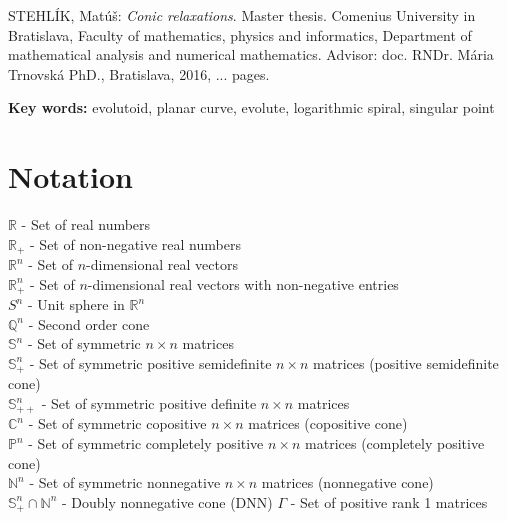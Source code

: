 \documentclass[12pt]{book}
\theoremstyle{definition}
\begin{document}
STEHLÍK, Matúš: {\it Conic relaxations}. Master thesis. Comenius University in Bratislava, Faculty of mathematics, physics and informatics, Department of mathematical analysis and numerical mathematics. Advisor: doc. RNDr. Mária Trnovská PhD., Bratislava, 2016, ... pages.

\bigskip


\bigskip

{\bf Key words: } evolutoid, planar curve, evolute, logarithmic spiral, singular point

\vfill\null\eject

\tableofcontents
\listoffigures


\newpage
\section*{Notation}

$\mathbb{R}$ - Set of real numbers \\
$\mathbb{R}_+$ - Set of non-negative real numbers \\
$\mathbb{R}^n$ - Set of $n$-dimensional real vectors   \\
$\mathbb{R}^n_{+}$ -  Set of $n$-dimensional real vectors with non-negative entries  \\

$S^n$ - Unit sphere in $\mathbb{R}^n$ \\

$\mathbb{Q}^n$ - Second order cone \\

$\mathbb{S}^n$ - Set of symmetric $n\times n$ matrices \\
$\mathbb{S}^n_+$ - Set of symmetric positive semidefinite $n\times n$ matrices (positive semidefinite cone) \\
$\mathbb{S}^n_{++}$ - Set of symmetric positive definite $n\times n$ matrices \\

$\mathbb{C}^n$ - Set of symmetric copositive $n\times n$ matrices (copositive cone) \\
$\mathbb{P}^n$ - Set of symmetric completely positive $n\times n$ matrices (completely positive cone)\\
$\mathbb{N}^n$ - Set of symmetric nonnegative $n\times n$ matrices (nonnegative cone) \\
$\mathbb{S}^n_+ \cap \mathbb{N}^n$ - Doubly nonnegative cone (DNN)
$\Gamma $ - Set of positive rank 1 matrices\\
\end{document}
